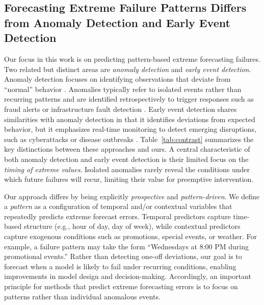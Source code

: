 \documentclass[]{interact}
\theoremstyle{plain}
\theoremstyle{definition}
\theoremstyle{remark}
\begin{document}
\renewcommand{\arraystretch}{1.3}

\subsection{Forecasting Extreme Failure Patterns Differs from Anomaly Detection and Early Event Detection}
\label{sec-contrasting}

Our focus in this work is on predicting pattern-based extreme forecasting failures. Two
related but distinct areas are \emph{anomaly detection} and \emph{early event detection}.
Anomaly detection focuses on identifying observations that deviate from ``normal'' behavior
\citep{chandola2009, nassif2021}. Anomalies typically refer to isolated events rather than
recurring patterns and are identified retrospectively to trigger responses such as fraud
alerts or infrastructure fault detection \citep{patcha2007, akouemo2016}.
Early event detection shares similarities with anomaly detection in that it identifies
deviations from expected behavior, but it emphasizes real-time monitoring to detect emerging
disruptions, such as cyberattacks or disease outbreaks \citep{wang2021, deljac2015,
shmueli2010}. Table~\ref{tab:contrast} summarizes the key distinctions between these
approaches and ours. A central characteristic of both anomaly detection and early event
detection is their limited focus on the \emph{timing of extreme values}. Isolated anomalies
rarely reveal the conditions under which future failures will recur, limiting their value
for preemptive intervention.

Our approach differs by being explicitly \emph{prospective} and \emph{pattern-driven}. We
define a \emph{pattern} as a configuration of temporal and/or contextual variables that
repeatedly predicts extreme forecast errors. Temporal predictors capture time-based structure
(e.g., hour of day, day of week), while contextual predictors capture exogenous conditions
such as promotions, special events, or weather. For example, a failure pattern may take the
form ``Wednesdays at 8:00 PM during promotional events.'' Rather than detecting one-off
deviations, our goal is to forecast when a model is likely to fail under recurring
conditions, enabling improvements in model design and decision-making. Accordingly, an
important principle for methods that predict extreme forecasting errors is to focus on
patterns rather than individual anomalous events.
\end{document}
